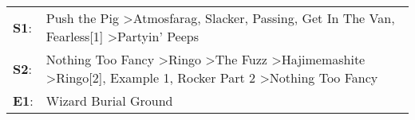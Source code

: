 \begin{supertabular}{p{0.03\textwidth}p{0.92\textwidth}}
 \textbf{S1}:  &                                                                                  Push the Pig\textsuperscript{} \textgreater \enspace Atmosfarag\textsuperscript{}, \enspace Slacker\textsuperscript{}, \enspace Passing\textsuperscript{}, \enspace Get In The Van\textsuperscript{}, \enspace Fearless[1]\textsuperscript{} \textgreater \enspace Partyin' Peeps\textsuperscript{}  \enspace  \\
 \textbf{S2}:  &  Nothing Too Fancy\textsuperscript{} \textgreater \enspace Ringo\textsuperscript{} \textgreater \enspace The Fuzz\textsuperscript{} \textgreater \enspace Hajimemashite\textsuperscript{} \textgreater \enspace Ringo[2]\textsuperscript{}, \enspace Example 1\textsuperscript{}, \enspace Rocker Part 2\textsuperscript{} \textgreater \enspace Nothing Too Fancy\textsuperscript{}  \enspace  \\
 \textbf{E1}:  &                                                                                                                                                                                                                                                                                                                                               Wizard Burial Ground\textsuperscript{}  \enspace  \\
\end{supertabular}
